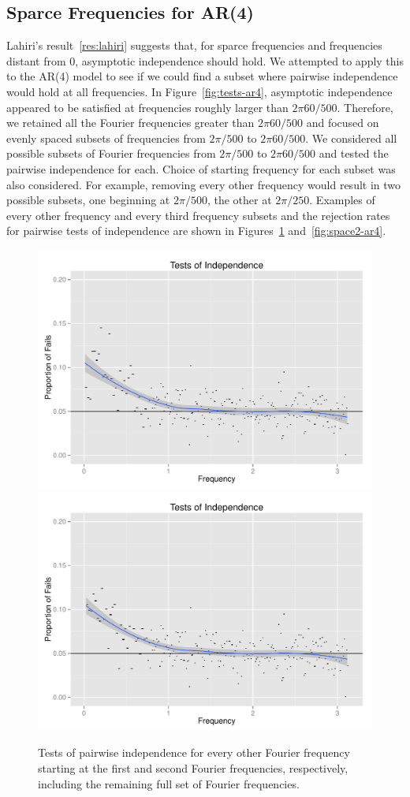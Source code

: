 \documentclass{article}\usepackage{graphicx, color}
\newenvironment{knitrout}{}{} %
\theoremstyle{plain}
\begin{document}
\subsection{Sparce Frequencies for AR(4)} \label{sec:sparce}
Lahiri's result~\ref{res:lahiri} suggests that, for sparce frequencies and frequencies distant from 0, asymptotic independence should hold. We attempted to apply this to the AR(4) model to see if we could find a subset where pairwise independence would hold at all frequencies. In Figure~\ref{fig:tests-ar4}, asymptotic independence appeared to be satisfied at frequencies roughly larger than $2 \pi 60/500$.  Therefore, we retained all the Fourier frequencies greater than $2 \pi 60/500$ and focused on evenly spaced subsets of frequencies from $2\pi/500$ to $2\pi 60/500$. We considered all possible subsets of Fourier frequencies from $2\pi/500$ to $2\pi 60/500$ and tested the pairwise independence for each. Choice of starting frequency for each subset was also considered. For example, removing every other frequency would result in two possible subsets, one beginning at $2\pi/500$, the other at $2\pi/250$. Examples of every other frequency and every third frequency subsets and the rejection rates for pairwise tests of independence are shown in Figures~\ref{fig:space1-ar4} and~\ref{fig:space2-ar4}.

\begin{knitrout}
\color{fgcolor}\begin{figure}[H]

\includegraphics[width=.49\textwidth]{figure/space1-ar41} 
\includegraphics[width=.49\textwidth]{figure/space1-ar42} \caption[Tests of pairwise independence for every other Fourier frequency starting at the first and second Fourier frequencies, respectively, including the remaining full set of Fourier frequencies]{Tests of pairwise independence for every other Fourier frequency starting at the first and second Fourier frequencies, respectively, including the remaining full set of Fourier frequencies.\label{fig:space1-ar4}}
\end{figure}


\end{knitrout}
\end{document}
